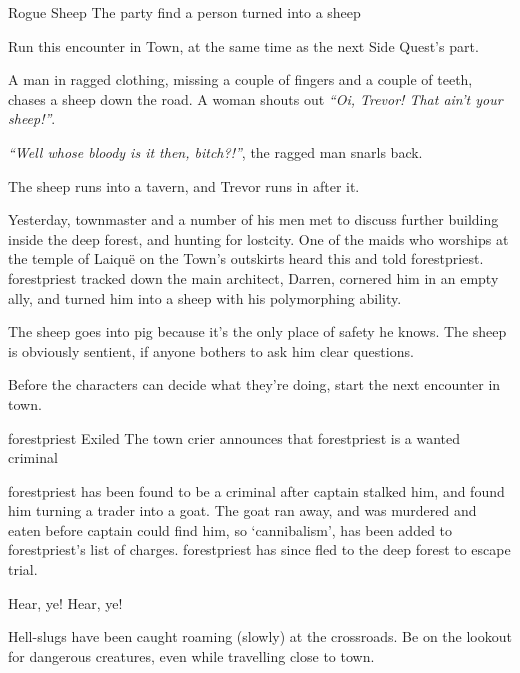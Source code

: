 \begin{multicols}{2}
{\squash Rogue Sheep}%
{The party find a person turned into a sheep}%

Run this encounter in Town, at the same time as the next Side Quest's part.

\begin{boxtext}

  A man in ragged clothing, missing a couple of fingers and a couple of teeth, chases a sheep down the road.  A woman shouts out \emph{``Oi, Trevor! That ain't your sheep!''}.

  \emph{``Well whose bloody is it then, bitch?!''}, the ragged man snarls back.

  The sheep runs into a tavern, and Trevor runs in after it.

\end{boxtext}

Yesterday, \gls{townmaster} and a number of his men met to discuss further building inside the deep forest, and hunting for \gls{lostcity}.
One of the maids who worships at the temple of Laiqu\"{e} on the Town's outskirts heard this and told \gls{forestpriest}.
\Gls{forestpriest} tracked down the main architect, Darren, cornered him in an empty ally, and turned him into a sheep with his polymorphing ability.

The sheep goes into \gls{pig} because it's the only place of safety he knows.  The sheep is obviously sentient, if anyone bothers to ask him clear questions.

Before the characters can decide what they're doing, start the next encounter in \gls{town}.

{\Gls{forestpriest} Exiled}%
{The town crier announces that \gls{forestpriest} is a wanted criminal}%

\Gls{forestpriest} has been found to be a criminal after \gls{captain} stalked him, and found him turning a trader into a goat.
The goat ran away, and was murdered and eaten before \gls{captain} could find him, so `cannibalism', has been added to \gls{forestpriest}'s list of charges.
\Gls{forestpriest} has since fled to the deep forest to escape trial.

\begin{speechtext}

  Hear, ye! Hear, ye!

  Hell-slugs have been caught roaming (slowly) at the crossroads.
  Be on the lookout for dangerous creatures, even while travelling close to \gls{town}.


\end{speechtext}
\end{multicols}
